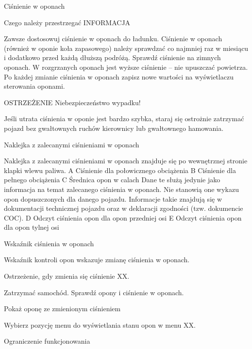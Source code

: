 Ciśnienie w oponach

Czego należy przestrzegać
INFORMACJA
\begin{itemizeTriangle}
	\itemTriangle Zawsze dostosowuj ciśnienie w oponach do ładunku.
	\itemTriangle Ciśnienie w oponach (również w oponie koła zapasowego) należy sprawdzać co najmniej raz w miesiącu i dodatkowo przed każdą dłuższą podróżą.
	\itemTriangle Sprawdź ciśnienie na zimnych oponach. W rozgrzanych oponach jest wyższe ciśnienie – nie upuszczać powietrza.
	\itemTriangle Po każdej zmianie ciśnienia w oponach zapisz nowe wartości na wyświetlaczu sterowania oponami.
\end{itemizeTriangle}

OSTRZEŻENIE
Niebezpieczeństwo wypadku!
\begin{itemizeTriangle}
	\itemTriangle Jeśli utrata ciśnienia w oponie jest bardzo szybka, staraj się ostrożnie zatrzymać pojazd bez gwałtownych ruchów kierownicy lub gwałtownego hamowania.
\end{itemizeTriangle}

Naklejka z zalecanymi ciśnieniami w oponach

Naklejka z zalecanymi ciśnieniami w oponach znajduje się po wewnętrznej stronie klapki wlewu paliwa.
A Ciśnienie dla połowicznego obciążenia
B Ciśnienie dla pełnego obciążenia
C Średnica opon w calach
Dane te służą jedynie jako informacja na temat zalecanego ciśnienia w oponach. Nie stanowią one wykazu opon dopuszczonych dla danego pojazdu. Informacje takie znajdują się w dokumentacji technicznej pojazdu oraz w deklaracji zgodności (tzw. dokumencie COC).
D Odczyt ciśnienia opon dla opon przedniej osi
E Odczyt ciśnienia opon dla opon tylnej osi

Wskaźnik ciśnienia w oponach

Wskaźnik kontroli opon wskazuje zmianę ciśnienia w oponach.

Ostrzeżenie, gdy zmienia się ciśnienie
XX.
\begin{itemizeArrow}
	\itemArrow Zatrzymać samochód.
	\itemArrow Sprawdź opony i ciśnienie w oponach.
\end{itemizeArrow}

Pokaż oponę ze zmienionym ciśnieniem

\begin{itemizeArrow}
	\itemArrow Wybierz pozycję menu do wyświetlania stanu opon w menu XX.
\end{itemizeArrow}

Ograniczenie funkcjonowania

